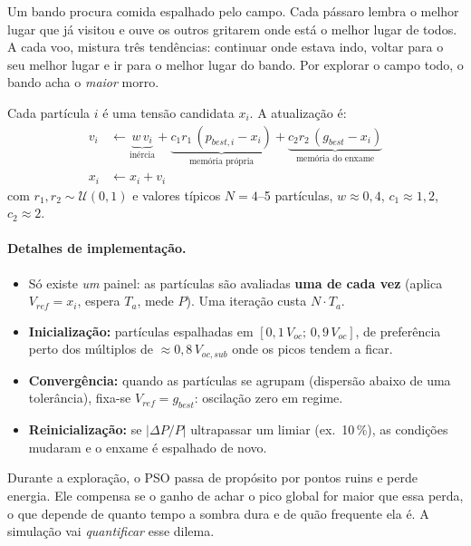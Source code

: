 \documentclass[11pt,a4paper]{article}
\begin{document}
\begin{intuicao}
Um bando procura comida espalhado pelo campo. Cada pássaro lembra o melhor lugar que já
visitou e ouve os outros gritarem onde está o melhor lugar de todos. A cada voo, mistura
três tendências: continuar onde estava indo, voltar para o seu melhor lugar e ir para o
melhor lugar do bando. Por explorar o campo todo, o bando acha o \emph{maior} morro.
\end{intuicao}

Cada partícula $i$ é uma tensão candidata $x_i$. A atualização é:
\begin{align}
v_i &\leftarrow \underbrace{w\,v_i}_{\text{inércia}}
  + \underbrace{c_1 r_1\,(p_{best,i}-x_i)}_{\text{memória própria}}
  + \underbrace{c_2 r_2\,(g_{best}-x_i)}_{\text{memória do enxame}}\\
x_i &\leftarrow x_i + v_i
\end{align}
com $r_1,r_2\sim\mathcal U(0,1)$ e valores típicos $N=4$--5 partículas, $w\approx0{,}4$,
$c_1\approx1{,}2$, $c_2\approx2$.

\paragraph{Detalhes de implementação.}
\begin{itemize}
\item Só existe \emph{um} painel: as partículas são avaliadas \textbf{uma de cada vez}
(aplica $V_{ref}=x_i$, espera $T_a$, mede $P$). Uma iteração custa $N\cdot T_a$.
\item \textbf{Inicialização:} partículas espalhadas em $[0{,}1\,V_{oc};\,0{,}9\,V_{oc}]$, de
preferência perto dos múltiplos de $\approx0{,}8\,V_{oc,sub}$ onde os picos tendem a ficar.
\item \textbf{Convergência:} quando as partículas se agrupam (dispersão abaixo de uma
tolerância), fixa-se $V_{ref}=g_{best}$: oscilação zero em regime.
\item \textbf{Reinicialização:} se $|\Delta P/P|$ ultrapassar um limiar (ex.\ 10\,\%), as
condições mudaram e o enxame é espalhado de novo.
\end{itemize}

\begin{resumo}
Durante a exploração, o PSO passa de propósito por pontos ruins e perde energia. Ele
compensa se o ganho de achar o pico global for maior que essa perda, o que depende de
quanto tempo a sombra dura e de quão frequente ela é. A simulação vai \emph{quantificar}
esse dilema.
\end{resumo}
\end{document}

